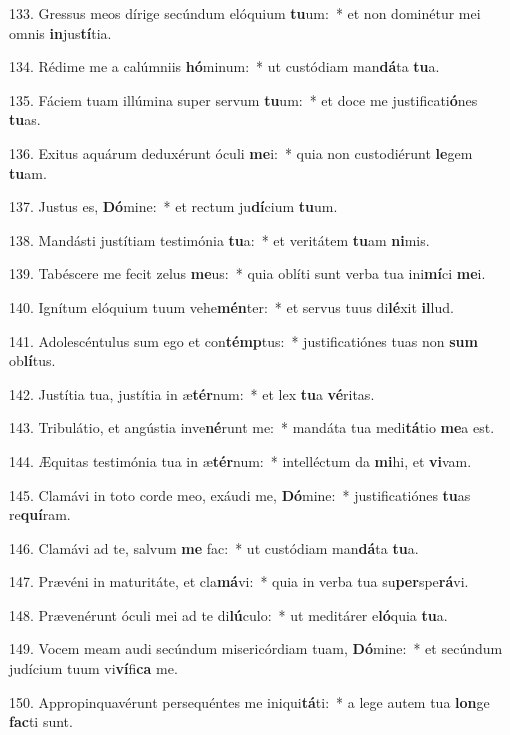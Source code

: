 133. Gressus meos dírige secúndum elóquium \textbf{tu}um:~*  et non dominétur mei omnis \textbf{in}jus\textbf{tí}tia.\

134. Rédime me a calúmniis \textbf{hó}minum:~*  ut custódiam man\textbf{dá}ta \textbf{tu}a.\

135. Fáciem tuam illúmina super servum \textbf{tu}um:~*  et doce me justificati\textbf{ó}nes \textbf{tu}as.\

136. Exitus aquárum deduxérunt óculi \textbf{me}i:~*  quia non custodiérunt \textbf{le}gem \textbf{tu}am.\

137. Justus es, \textbf{Dó}mine:~*  et rectum ju\textbf{dí}cium \textbf{tu}um.\

138. Mandásti justítiam testimónia \textbf{tu}a:~*  et veritátem \textbf{tu}am \textbf{ni}mis.\

139. Tabéscere me fecit zelus \textbf{me}us:~*  quia oblíti sunt verba tua ini\textbf{mí}ci \textbf{me}i.\

140. Ignítum elóquium tuum vehe\textbf{mén}ter:~*  et servus tuus di\textbf{lé}xit \textbf{il}lud.\

141. Adolescéntulus sum ego et con\textbf{témp}tus:~*  justificatiónes tuas non \textbf{sum} ob\textbf{lí}tus.\

142. Justítia tua, justítia in æ\textbf{tér}num:~*  et lex \textbf{tu}a \textbf{vé}ritas.\

143. Tribulátio, et angústia inve\textbf{né}runt me:~*  mandáta tua medi\textbf{tá}tio \textbf{me}a est.\

144. Æquitas testimónia tua in æ\textbf{tér}num:~*  intelléctum da \textbf{mi}hi, et \textbf{vi}vam.\

145. Clamávi in toto corde meo, exáudi me, \textbf{Dó}mine:~*  justificatiónes \textbf{tu}as re\textbf{quí}ram.\

146. Clamávi ad te, salvum \textbf{me} fac:~*  ut custódiam man\textbf{dá}ta \textbf{tu}a.\

147. Prævéni in maturitáte, et cla\textbf{má}vi:~*  quia in verba tua su\textbf{per}spe\textbf{rá}vi.\

148. Prævenérunt óculi mei ad te di\textbf{lú}culo:~*  ut meditárer e\textbf{ló}quia \textbf{tu}a.\

149. Vocem meam audi secúndum misericórdiam tuam, \textbf{Dó}mine:~*  et secúndum judícium tuum vi\textbf{ví}fi\textbf{ca} me.\

150. Appropinquavérunt persequéntes me iniqui\textbf{tá}ti:~*  a lege autem tua \textbf{lon}ge \textbf{fac}ti sunt.\

